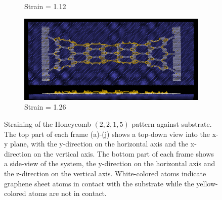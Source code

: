 \begin{figure}[H]
\begin{subfigure}[b]{0.49\textwidth}
        \caption{Strain = 1.12}
    \end{subfigure}
    \begin{subfigure}[b]{0.49\textwidth}
        \centering
        \includegraphics[width=\textwidth]{figures/baseline/contact_vs_stretch/honeycomb/hon_stretch0126.png}
        \caption{Strain = 1.26}
    \end{subfigure}
    \hfill
       \caption{Straining of the Honeycomb $(2,2,1,5)$ pattern against substrate. The top part of each frame (a)-(j) shows a top-down view into the x-y plane, with the y-direction on the horizontal axis and the x-direction on the vertical axis. The bottom part of each frame shows a side-view of the system, the y-direction on the horizontal axis and the z-direction on the vertical axis. White-colored atoms indicate graphene sheet atoms in contact with the substrate while the yellow-colored atoms are not in contact.}
       \label{fig:honeycomb_strain}
  \end{figure}
  



  

